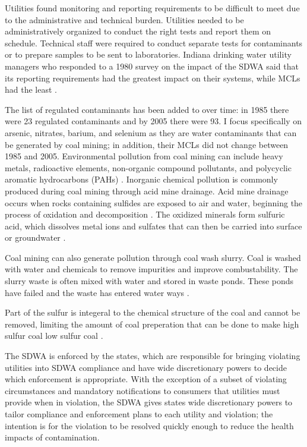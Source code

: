 \documentclass[12pt]{article}
\begin{document}
Utilities found monitoring and reporting requirements to be difficult to meet due to the administrative and technical burden. Utilities needed to be administratively organized to conduct the right tests and report them on schedule. Technical staff were required to conduct separate tests for contaminants or to prepare samples to be sent to laboratories. Indiana drinking water utility managers who responded to a 1980 survey on the impact of the SDWA said that its reporting requirements had the greatest impact on their systems, while MCLs had the least \parencite{oleckno1982national}.

The list of regulated contaminants has been added to over time: in 1985 there were 23 regulated contaminants and by 2005 there were 93. I focus specifically on arsenic, nitrates, barium, and selenium as they are water contaminants that can be generated by coal mining; in addition, their MCLs did not change between 1985 and 2005. Environmental pollution from coal mining can include heavy metals, radioactive elements, non-organic compound pollutants, and polycyclic aromatic hydrocarbons (PAHs) \parencite{rouhani2023overview,boente2020benzo,liang2017spatial}. Inorganic chemical pollution is commonly produced during coal mining through acid mine drainage. Acid mine drainage occurs when rocks containing sulfides are exposed to air and water, beginning the process of oxidation and decomposition \parencite{ceto2000abandoned}. The oxidized minerals form sulfuric acid, which dissolves metal ions and sulfates that can then be carried into surface or groundwater \parencite{akcil2006acid,skousen2019acid}.

Coal mining can also generate pollution through coal wash slurry. Coal is washed with water and chemicals to remove impurities and improve combustability. The slurry waste is often mixed with water and stored in waste ponds. These ponds have failed and the waste has entered water ways \parencite{Sealey2000}.

Part of the sulfur is integeral to the chemical structure of the coal and cannot be removed, limiting the amount of coal preperation that can be done to make high sulfur coal low sulfur coal \parencite{wheelock1984coal}.

The SDWA is enforced by the states, which are responsible for bringing violating utilities into SDWA compliance and have wide discretionary powers to decide which enforcement is appropriate. With the exception of a subset of violating circumstances and mandatory notifications to consumers that utilities must provide when in violation, the SDWA gives states wide discretionary powers to tailor compliance and enforcement plans to each utility and violation; the intention is for the violation to be resolved quickly enough to reduce the health impacts of contamination.
\end{document}

